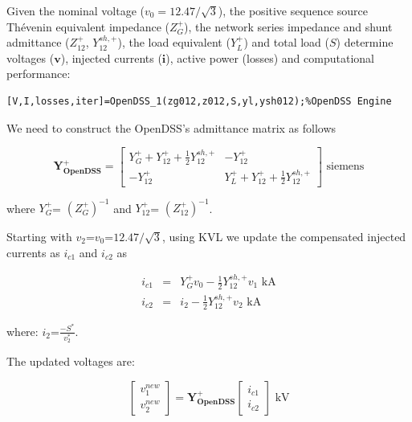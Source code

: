 \documentclass[12pt]{article}
\begin{document}
Given the nominal voltage ($v_0=12.47/\sqrt{3}$), the positive sequence source Th\'evenin equivalent impedance (${Z}^{+}_{G}$), the network series impedance and shunt admittance (${Z}^{+}_{12}$, ${Y}^{sh,+}_{12}$), the load equivalent (${Y}^{+}_{L}$) and total load (${S}$)
determine voltages ($\bm{v}$), injected currents ($\mathbf{i}$), active power (losses) and computational performance:
    
\begin{verbatim}
[V,I,losses,iter]=OpenDSS_1(zg012,z012,S,yl,ysh012);%OpenDSS Engine
\end{verbatim}

We need to construct the OpenDSS's admittance matrix as follows

\begin{equation}
\mathbf{Y^{+}_{OpenDSS}}=\left[ \begin{array}{cc}
               {Y}^{+}_{G}+{Y}^{+}_{12}+\frac{
1}{2}{Y}^{sh,+}_{12} &-{Y}^{+}_{12} \\
              -{Y}^{+}_{12}  & {Y}^{+}_{L}+{Y}^{+}_{12}+\frac{
1}{2}{Y}^{sh,+}_{12}
             \end{array}
           \right] \mbox{ siemens}\end{equation}

where  ${Y}^{+}_{G}$= $(Z^{+}_{G})^{-1}$ and
${Y}^{+}_{12}$= $(Z^{+}_{12})^{-1}$.

Starting with ${v}_2$=$v_0$=$12.47/\sqrt{3}$, using KVL we update the compensated injected currents as ${i}_{c1}$ and ${i}_{c2}$ as

\begin{eqnarray}
  {i}_{c1}&=&{Y}^{+}_{G}v_0-\frac{1}{2}{Y}^{sh,+}_{12}v_1\mbox{ kA}\\
    {i}_{c2}&=&{i}_{2}-\frac{1}{2}{Y}^{sh,+}_{12}v_2\mbox{ kA}
\end{eqnarray}

where:   ${i}_2$=$\frac{-{S}^*}{{v}^*_2}$.
 
The updated voltages are:

\begin{equation}
\begin{bmatrix}
	{v}^{new}_1\\ 
	{v}^{new}_2
\end{bmatrix}=
  \mathbf{{Y}^{+}_{OpenDSS}}
  \begin{bmatrix}
  {i}_{c1}\\
  {i}_{c2}\end{bmatrix}
    \mbox{ kV}
\end{equation}
\end{document}
